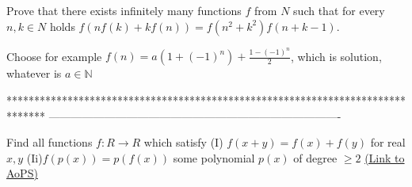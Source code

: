 \begin{solution}
	\begin{tcolorbox}Prove that there exists infinitely many functions  $f $ from $N $ such that for every $n,k \in N $ holds
$f (nf (k)+kf (n))=f (n^2+k^2)f (n+k-1) $.\end{tcolorbox}
Choose for example $f(n)=a(1+(-1)^n)+\frac{1-(-1)^n}2$, which is solution, whatever is $a\in\mathbb N$


\end{solution}
*******************************************************************************
-------------------------------------------------------------------------------

\begin{problem}
	Find all functions  $f:R\longrightarrow R $ which satisfy
(I) $f (x+y)=f (x)+f (y) $ for real $x,y $
(Ii)$f (p (x))=p (f (x)) $ some polynomial  $p (x) $ of degree  $\ge2$
	\flushright \href{https://artofproblemsolving.com/community/c6h1570155}{(Link to AoPS)}
\end{problem}



